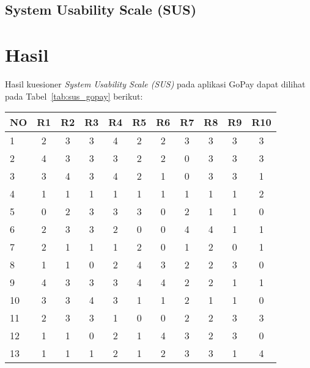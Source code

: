 \documentclass[
 manuscript=article,  %
  layout=publish, 
  year=2024, 
  month= Februari, %
  volume=8,
  number=1 
]{JIKO}
\begin{document}
\subsection{System Usability Scale (SUS)}

\section{Hasil}

Hasil kuesioner \textit{System Usability Scale (SUS)} pada aplikasi GoPay dapat dilihat pada Tabel~\ref{tab:sus_gopay} berikut:
\usepackage{graphicx}

\begin{table}[hbt!]
    \begin{threeparttable}
        \begin{tabular}{l*{10}{c}}
            \toprule
            \textbf{NO} & \textbf{R1} & \textbf{R2} & \textbf{R3} & \textbf{R4} & \textbf{R5} & \textbf{R6} & \textbf{R7} & \textbf{R8} & \textbf{R9} & \textbf{R10} \\
            \midrule
            1  & 2 & 3 & 3 & 4 & 2 & 2 & 3 & 3 & 3 & 3 \\
            \hline
            2  & 4 & 3 & 3 & 3 & 2 & 2 & 0 & 3 & 3 & 3 \\
            \hline
            3  & 3 & 4 & 3 & 4 & 2 & 1 & 0 & 3 & 3 & 1 \\
            \hline
            4  & 1 & 1 & 1 & 1 & 1 & 1 & 1 & 1 & 1 & 2 \\
            \hline
            5  & 0 & 2 & 3 & 3 & 3 & 0 & 2 & 1 & 1 & 0 \\
            \hline
            6  & 2 & 3 & 3 & 2 & 0 & 0 & 4 & 4 & 1 & 1 \\
            \hline
            7  & 2 & 1 & 1 & 1 & 2 & 0 & 1 & 2 & 0 & 1 \\
            \hline
            8  & 1 & 1 & 0 & 2 & 4 & 3 & 2 & 2 & 3 & 0 \\
            \hline
            9  & 4 & 3 & 3 & 3 & 4 & 4 & 2 & 2 & 1 & 1 \\
            \hline
            10 & 3 & 3 & 4 & 3 & 1 & 1 & 2 & 1 & 1 & 0 \\
            \hline
            11 & 2 & 3 & 3 & 1 & 0 & 0 & 2 & 2 & 3 & 3 \\
            \hline
            12 & 1 & 1 & 0 & 2 & 1 & 4 & 3 & 2 & 3 & 0 \\
            \hline
            13 & 1 & 1 & 1 & 2 & 1 & 2 & 3 & 3 & 1 & 4 \\

\end{tabular}
\end{threeparttable}
\end{table}
\end{document}
